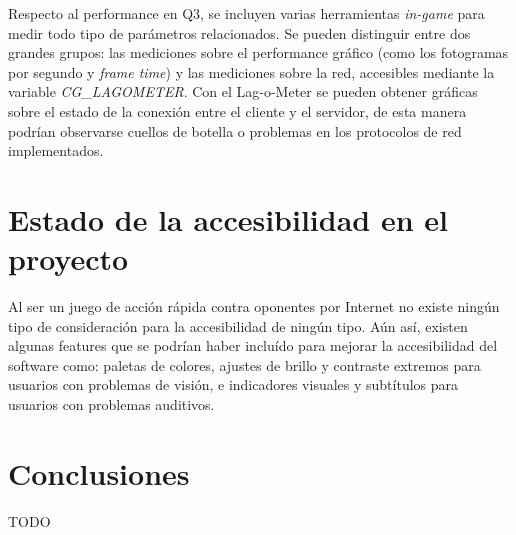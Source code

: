 \documentclass[a4paper,12pt]{report}
\begin{document}
    Respecto al performance en Q3, se incluyen varias herramientas\textit{ in-game }para medir todo tipo de parámetros relacionados. Se pueden distinguir entre dos grandes grupos: las mediciones sobre el performance gráfico (como los fotogramas por segundo y \textit{frame time}) y las mediciones sobre la red, accesibles mediante la variable \textit{CG\_LAGOMETER}. Con el Lag-o-Meter se pueden obtener gráficas sobre el estado de la conexión entre el cliente y el servidor, de esta manera podrían observarse cuellos de botella o problemas en los protocolos de red implementados.
	
	\section{Estado de la accesibilidad en el proyecto}
    Al ser un juego de acción rápida contra oponentes por Internet no existe ningún tipo de consideración para la accesibilidad de ningún tipo. Aún así, existen algunas features que se podrían haber incluído para mejorar la accesibilidad del software como: paletas de colores,  ajustes de brillo y contraste extremos para usuarios con problemas de visión, e indicadores visuales y subtítulos para usuarios con problemas auditivos.
	
	\section{Conclusiones}
	TODO\\
    
\end{document}
